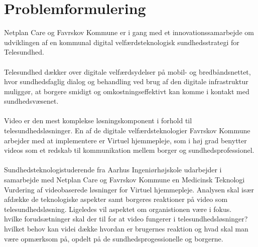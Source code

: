 \chapter{Problemformulering}

Netplan Care og Favrskov Kommune er i gang med et innovationssamarbejde om udviklingen af en kommunal digital velfærdsteknologisk sundhedsstrategi for Telesundhed. 
\\ \\
Telesundhed dækker over digitale velfærdsydelser på mobil- og bredbåndsnettet, hvor sundhedsfaglig dialog og behandling ved brug af den digitale infrastruktur muliggør, at borgere smidigt og omkostningseffektivt kan komme i kontakt med sundhedsvæsenet.    
\\ \\
Video er den mest komplekse løsningskomponent i forhold til telesundhedsløsninger. En af de digitale velfærdsteknologier Favrskov Kommune arbejder med at implementere er Virtuel hjemmepleje, som i høj grad benytter videos som et redskab til kommunikation mellem borger og sundhedsprofessionel. 
\\ \\
Sundhedsteknologistuderende fra Aarhus Ingeniørhøjskole udarbejder i samarbejde med Netplan Care og Favrskov Kommune en Medicinsk Teknologi Vurdering af videobaserede løsninger for Virtuel hjemmepleje. Analysen skal især afdække de teknologiske aspekter samt borgeres reaktioner på video som telesundhedsløsning. Ligeledes vil aspektet om organistionen være i fokus. 
\\
hvilke forudsætninger skal der til for at video fungerer i telesundhedsløsninger? 
hvilket behov kan videi dække 
hvordan er brugernes reaktion og hvad skal man være opmærksom på, opdelt på de sundhedsprogessionelle og borgerne. 